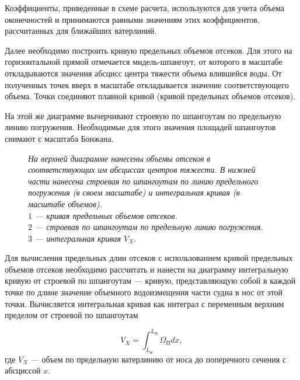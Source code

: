 Коэффициенты, приведенные в схеме расчета, используются для учета объема оконечностей и принимаются равными значениям этих коэффициентов, рассчитанных для ближайших ватерлиний.

Далее необходимо построить кривую предельных объемов отсеков.
Для этого на горизонтальной прямой отмечается мидель-шпангоут, от которого в масштабе откладываются значения абсцисс центра тяжести объема влившейся воды.
От полученных точек вверх в масштабе откладывается значение соответствующего объема.
Точки соединяют плавной кривой (кривой предельных объемов отсеков).

На этой же диаграмме вычерчивают строевую по шпангоутам по предельную линию погружения.
Необходимые для этого значения площадей шпангоутов снимают с масштаба Бонжана.

\begin{figure}[h!]
    \centerline{}
    \caption{К расчету кривой предельных длин отсеков}
    \caption*{\textit{На верхней диаграмме нанесены объемы отсеков в соответствующих им абсциссах центров тяжести.
    В нижней части нанесена строевая по шпангоутам по линию предельного погружения (в своем масштабе) и интегральная кривая (в масштабе объемов).\\
    $1$ --- кривая предельных объемов отсеков.\\
    $2$ --- строевая по шпангоутам по предельную линию погружения.\\
    $3$ --- интегральная кривая $V_X$.
    }}
    \label{fig:max-volume-curve}
\end{figure}

Для вычисления предельных длин отсеков с использованием кривой предельных объемов отсеков необходимо рассчитать и нанести на диаграмму интегральную кривую от строевой по шпангоутам --- кривую, представляющую собой в каждой точке по длине значение объемного водоизмещения части судна в нос от этой точки.
Вычисляется интегральная кривая как интеграл с переменным верхним пределом от строевой по шпангоутам

\begin{equation}
    V_X = \int_{L_{\text{К}}}^{L_{\text{Н}}} \Omega_{\text{П}} dx,
\end{equation}
где $V_X$ --- объем по предельную ватерлинию от носа до поперечного сечения с абсциссой $x$.

